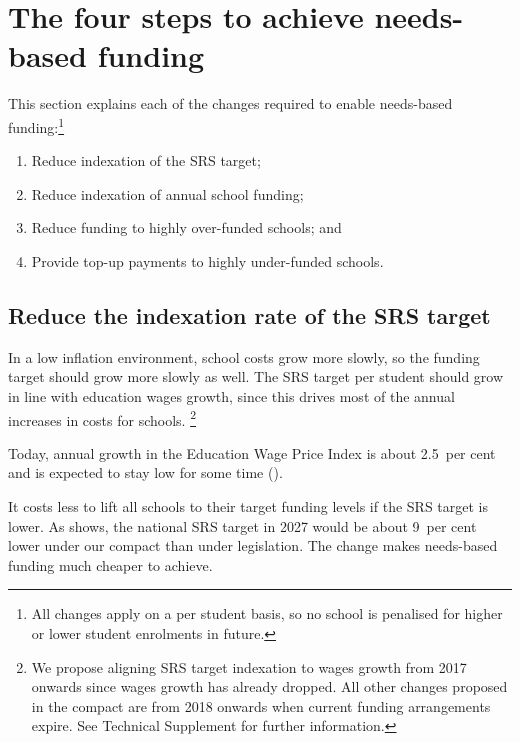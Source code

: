 \documentclass{grattan}
\begin{document}
\section{The four steps to achieve needs-based funding}\label{sec:details-of-the-four-steps-to-achieve-needs-based-funding}

This section explains each of the changes required to enable needs-based funding:\footnote{All changes apply on a per student basis, so no school is penalised for higher or lower student enrolments in future.}

\begin{enumerate}
\item
  Reduce indexation of the SRS target;
\item
  Reduce indexation of annual school funding;
\item
  Reduce funding to highly over-funded schools; and
\item
  Provide top-up payments to highly under-funded schools.
\end{enumerate}

\subsection{Reduce the indexation rate of the SRS target}\label{subsec:i-reduce-the-indexation-rate-of-the-srs-target}

In a low inflation environment, school costs grow more slowly, so the funding target should grow more slowly as well.
The SRS target per student should grow in line with education wages growth, since this drives most of the annual increases in costs for schools.%
\footnote{We propose aligning SRS target indexation to wages growth from 2017 onwards since wages growth has already dropped.
All other changes proposed in the compact are from 2018 onwards when current funding arrangements expire.
See Technical Supplement for further information.}

Today, annual growth in the Education Wage Price Index is about 2.5~per cent and is expected to stay low for some time ().

It costs less to lift all schools to their target funding levels if the SRS target is lower.
As  shows, the national SRS target in 2027 would be about 9~per cent lower under our compact than under legislation.
The change makes needs-based funding much cheaper to achieve.
\end{document}
